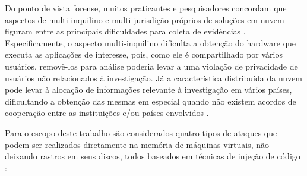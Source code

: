 \documentclass[conference]{IEEEtran}
\newcommand{\marcos}[1]{{\color{blue}{MARCOS: #1}}}
\begin{document}
Do ponto de vista forense, muitos praticantes e pesquisadores concordam que aspectos de multi-inquilino e multi-jurisdição próprios de soluções em nuvem figuram entre as principais dificuldades para coleta de evidências \cite{Bash2015a}. 
%
Especificamente, o aspecto multi-inquilino dificulta a obtenção do hardware que executa as aplicações de interesse, pois, como ele é compartilhado por vários usuários, removê-los para análise poderia levar a uma violação de privacidade de usuários não relacionados à investigação. 
%
Já a característica distribuída da nuvem pode levar à alocação de informações relevante à investigação em vários países, dificultando a obtenção das mesmas em especial quando não existem acordos de cooperação entre as instituições e/ou países envolvidos \cite{Dykstra2012a}.


%
Para o escopo deste trabalho são considerados quatro tipos de ataques que podem ser realizados diretamente na memória de máquinas virtuais, não deixando rastros em seus discos, todos baseados em técnicas de injeção de código \cite{Case2014}:
\end{document}
